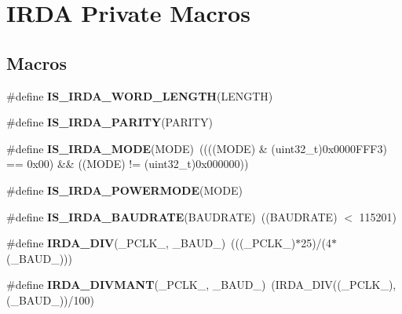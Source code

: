 \hypertarget{group___i_r_d_a___private___macros}{}\section{I\+R\+DA Private Macros}
\label{group___i_r_d_a___private___macros}
\subsection*{Macros}
\begin{DoxyCompactItemize}
\item 
\#define {\bfseries I\+S\+\_\+\+I\+R\+D\+A\+\_\+\+W\+O\+R\+D\+\_\+\+L\+E\+N\+G\+TH}(L\+E\+N\+G\+TH)
\item 
\#define {\bfseries I\+S\+\_\+\+I\+R\+D\+A\+\_\+\+P\+A\+R\+I\+TY}(P\+A\+R\+I\+TY)
\item 
\#define {\bfseries I\+S\+\_\+\+I\+R\+D\+A\+\_\+\+M\+O\+DE}(M\+O\+DE)~((((M\+O\+DE) \& (uint32\+\_\+t)0x0000\+F\+F\+F3) == 0x00) \&\& ((\+M\+O\+D\+E) != (uint32\+\_\+t)0x000000))\hypertarget{group___i_r_d_a___private___macros_ga0374a7ffe9d35087bc02ccdac0953a1d}{}\label{group___i_r_d_a___private___macros_ga0374a7ffe9d35087bc02ccdac0953a1d}

\item 
\#define {\bfseries I\+S\+\_\+\+I\+R\+D\+A\+\_\+\+P\+O\+W\+E\+R\+M\+O\+DE}(M\+O\+DE)
\item 
\#define {\bfseries I\+S\+\_\+\+I\+R\+D\+A\+\_\+\+B\+A\+U\+D\+R\+A\+TE}(B\+A\+U\+D\+R\+A\+TE)~((B\+A\+U\+D\+R\+A\+TE) $<$ 115201)\hypertarget{group___i_r_d_a___private___macros_ga5816332e344ead2dcd06a1f0ed59ae27}{}\label{group___i_r_d_a___private___macros_ga5816332e344ead2dcd06a1f0ed59ae27}

\item 
\#define {\bfseries I\+R\+D\+A\+\_\+\+D\+IV}(\+\_\+\+P\+C\+L\+K\+\_\+,  \+\_\+\+B\+A\+U\+D\+\_\+)~(((\+\_\+\+P\+C\+L\+K\+\_\+)$\ast$25)/(4$\ast$(\+\_\+\+B\+A\+U\+D\+\_\+)))\hypertarget{group___i_r_d_a___private___macros_gae414cb88195361652fbda5a33bb730b9}{}\label{group___i_r_d_a___private___macros_gae414cb88195361652fbda5a33bb730b9}

\item 
\#define {\bfseries I\+R\+D\+A\+\_\+\+D\+I\+V\+M\+A\+NT}(\+\_\+\+P\+C\+L\+K\+\_\+,  \+\_\+\+B\+A\+U\+D\+\_\+)~(I\+R\+D\+A\+\_\+\+D\+IV((\+\_\+\+P\+C\+L\+K\+\_\+), (\+\_\+\+B\+A\+U\+D\+\_\+))/100)\hypertarget{group___i_r_d_a___private___macros_ga3bb3188956e72958105fc4bb8b663370}{}\label{group___i_r_d_a___private___macros_ga3bb3188956e72958105fc4bb8b663370}


\end{DoxyCompactItemize}
